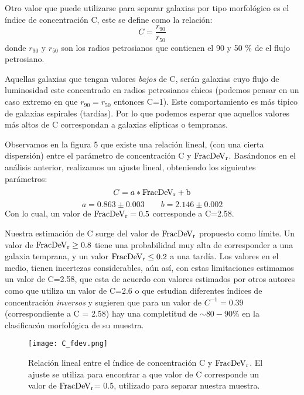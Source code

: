 \documentclass[a4paper,10pt]{article}
\newcommand{\fdev}{\rm FracDeV_{r}}
\begin{document}
Otro valor que puede utilizarse para separar galaxias por tipo morfol\'ogico es el \'indice de concentraci\'on C, este se define como la relación: 
\begin{equation}
C=\frac{r_{90}}{r_{50}}                                                             
\end{equation}
donde $r_{90}$ y $r_{50}$ son los radios petrosianos que contienen el 90 y 50 $\%$ de el flujo petrosiano. 


Aquellas galaxias que tengan valores \textit{bajos} de C, ser\'an galaxias cuyo flujo de luminosidad este concentrado en radios petrosianos chicos (podemos pensar en un caso extremo en que $r_{90}=r_{50}$ entonces C=1). Este comportamiento es m\'as tipico de galaxias espirales (tard\'ias). Por lo que podemos esperar que aquellos valores m\'as altos de C correspondan a galaxias el\'ipticas o tempranas. 
    

Observamos en la figura 5 que existe una relaci\'on lineal, (con una cierta dispersi\'on) entre el par\'ametro de concentraci\'on C y $\fdev$. Bas\'andonos en el an\'alisis anterior, realizamos un ajuste lineal, obteniendo los siguientes par\'ametros: 
\begin{equation}
 C=a*\fdev+b
\end{equation}
$$
a=0.863 \pm 0.003  \qquad b=2.146 \pm 0.002
$$
Con lo cual, un valor de $\fdev=0.5$ corresponde a C=2.58.


Nuestra estimaci\'on de C surge del valor de $\fdev$ propuesto como l\'imite. Un valor de $\fdev\geq0.8$ tiene una probabilidad muy alta de corresponder a una galaxia temprana, y un valor $\fdev\leq0.2$ a una tard\'ia. Los valores en el medio, tienen incertezas considerables, a\'un as\'i, con estas limitaciones estimamos un valor de C=2.58, que esta de acuerdo con valores estimados por otros autores como \citet{Strateva2001} que utiliza un valor de C=2.6 o \citet{Shimasaku2001} que estudian diferentes \'indices de concentraci\'on \textit{inversos} y sugieren que para un valor de $C^{-1}= 0.39$ (correspondiente a C = 2.58) hay una completitud de $\sim80-90\%$ en la clasificac\'on morfol\'ogica de su muestra. 



\begin{figure}[h]
 \centering
 \texttt{[image: C\_fdev.png]}
 \caption{Relaci\'on lineal entre el \'indice de concentraci\'on C y $\fdev$. El ajuste se utiliza para encontrar a que valor de C corresponde un valor de $\fdev$= 0.5, utilizado para separar nuestra muestra.}
 \label{5}
\end{figure}
\end{document}
